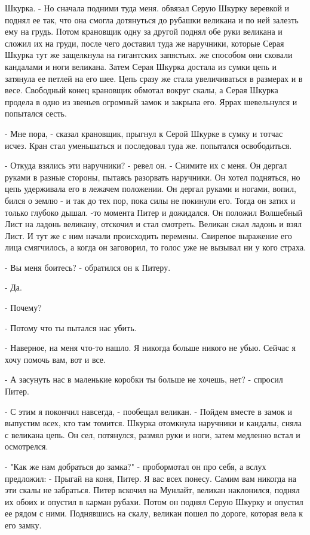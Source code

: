 Шкурка. - Но сначала подними туда меня.
 обвязал Серую Шкурку веревкой и поднял ее так, что она 
смогла дотянуться до рубашки великана и по ней залезть ему на грудь. 
Потом крановщик одну за другой поднял обе руки великана и сложил их на 
груди, после чего доставил туда же наручники, которые Серая Шкурка тут 
же защелкнула на гигантских запястьях.
 же способом они сковали кандалами и ноги великана. Затем Серая 
Шкурка достала из сумки цепь и затянула ее петлей на его шее. Цепь 
сразу же стала увеличиваться в размерах и в весе. Свободный конец 
крановщик обмотал вокруг скалы, а Серая Шкурка продела в одно из 
звеньев огромный замок и закрыла его.
 Яррах шевельнулся и попытался сесть.
\par- Мне пора, - сказал крановщик, прыгнул к Серой Шкурке в сумку и 
тотчас исчез. Кран стал уменьшаться и последовал туда же.
 попытался освободиться.
\par- Откуда взялись эти наручники? - ревел он. - Снимите их с меня.
Он дергал руками в разные стороны, пытаясь разорвать наручники. Он 
хотел подняться, но цепь удерживала его в лежачем положении. Он дергал 
руками и ногами, вопил, бился о землю - и так до тех пор, пока силы не 
покинули его. Тогда он затих и только глубоко дышал.
-то момента Питер и дожидался. Он положил Волшебный Лист на 
ладонь великану, отскочил и стал смотреть. Великан сжал ладонь и взял 
Лист. И тут же с ним начали происходить перемены. Свирепое выражение 
его лица смягчилось, а когда он заговорил, то голос уже не вызывал ни 
у кого страха.
\par- Вы меня боитесь? - обратился он к Питеру.
\par- Да.
\par- Почему?
\par- Потому что ты пытался нас убить.
\par- Наверное, на меня что-то нашло. Я никогда больше никого не убью. 
Сейчас я хочу помочь вам, вот и все.
\par- А засунуть нас в маленькие коробки ты больше не хочешь, нет? - 
спросил Питер.
\par- С этим я покончил навсегда, - пообещал великан. - Пойдем вместе 
в замок и выпустим всех, кто там томится.
 Шкурка отомкнула наручники и кандалы, сняла с великана цепь. 
Он сел, потянулся, размял руки и ноги, затем медленно встал и 
осмотрелся.
\par- "Как же нам добраться до замка?" - пробормотал он про себя, а 
вслух предложил: - Прыгай на коня, Питер. Я вас всех понесу. Самим вам 
никогда на эти скалы не забраться.
 Питер вскочил на Мунлайт, великан наклонился, поднял их 
обоих и опустил в карман рубахи. Потом он поднял Серую Шкурку и 
опустил ее рядом с ними. Поднявшись на скалу, великан пошел по дороге, 
которая вела к его замку.
